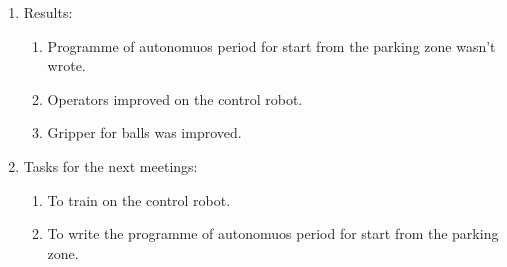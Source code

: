 \begin{enumerate}
\begin{enumerate}
	\end{enumerate}
	
	\item Results:
	\begin{enumerate}
		
		\item Programme of autonomuos period for start from the parking zone wasn't wrote.
		
        \item Operators improved on the control robot.
        
        \item Gripper for balls was improved.
		
	\end{enumerate}
	
	\item Tasks for the next meetings:
	\begin{enumerate}
		
		\item To train on the control robot.
		
        \item To write the programme of autonomuos period for start from the parking zone.
        	
	\end{enumerate}
\end{enumerate}
\fillpage
